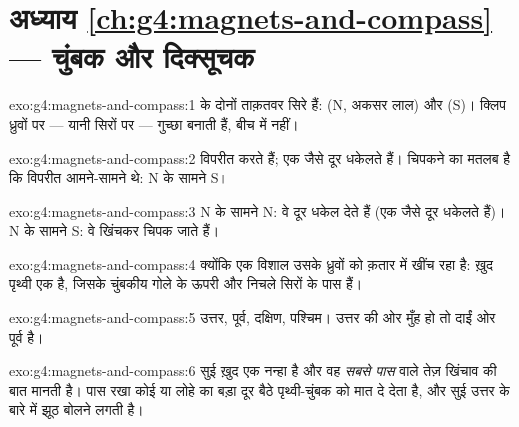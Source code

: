 \section*{अध्याय \ref{ch:g4:magnets-and-compass} --- चुंबक और दिक्सूचक}

\begin{solution}{exo:g4:magnets-and-compass:1}
  के दोनों ताक़तवर सिरे हैं:  (N, अकसर लाल)
और  (S)। क्लिप ध्रुवों पर --- यानी सिरों पर --- गुच्छा
बनाती हैं, बीच में नहीं।
\end{solution}

\begin{solution}{exo:g4:magnets-and-compass:2}
विपरीत   करते हैं; एक जैसे  दूर धकेलते हैं। चिपकने
का मतलब है कि विपरीत  आमने-सामने थे: N के सामने S।
\end{solution}

\begin{solution}{exo:g4:magnets-and-compass:3}
N के सामने N: वे दूर धकेल देते हैं (एक जैसे  दूर धकेलते हैं)।
N के सामने S: वे खिंचकर चिपक जाते हैं।
\end{solution}

\begin{solution}{exo:g4:magnets-and-compass:4}
क्योंकि एक विशाल  उसके ध्रुवों को क़तार में खींच रहा है: ख़ुद
पृथ्वी एक  है, जिसके चुंबकीय  गोले के ऊपरी और निचले सिरों के
पास हैं।
\end{solution}

\begin{solution}{exo:g4:magnets-and-compass:5}
उत्तर, पूर्व, दक्षिण, पश्चिम। उत्तर की ओर मुँह हो तो दाईं ओर पूर्व
है।
\end{solution}

\begin{solution}{exo:g4:magnets-and-compass:6}
सुई ख़ुद एक नन्हा  है और वह \emph{सबसे पास} वाले तेज़ खिंचाव की
बात मानती है। पास रखा कोई  या लोहे का बड़ा  दूर बैठे
पृथ्वी-चुंबक को मात दे देता है, और सुई उत्तर के बारे में झूठ बोलने
लगती है।
\end{solution}

